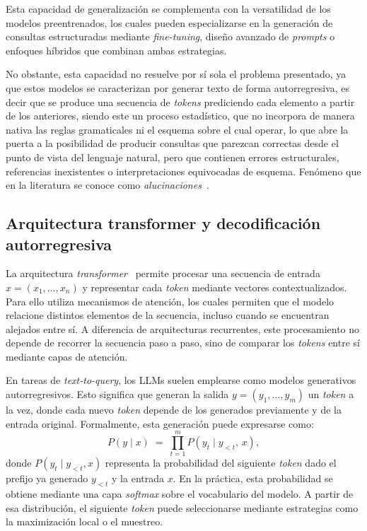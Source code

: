 Esta capacidad de generalización se complementa con la versatilidad de los modelos preentrenados, los cuales pueden especializarse en la generación de consultas estructuradas mediante \emph{fine-tuning}, diseño avanzado de \emph{prompts} o enfoques híbridos que combinan ambas estrategias.

No obstante, esta capacidad no resuelve por sí sola el problema presentado, ya que estos modelos se caracterizan por generar texto de forma autorregresiva, es decir que se produce una secuencia de \emph{tokens} prediciendo cada elemento a partir de los anteriores, siendo este un proceso estadístico, que no incorpora de manera nativa las reglas gramaticales ni el esquema sobre el cual operar, lo que abre la puerta a la posibilidad de producir consultas que parezcan correctas desde el punto de vista del lenguaje natural, pero que contienen errores estructurales, referencias inexistentes o interpretaciones equivocadas de esquema. Fenómeno que en la literatura se conoce como \emph{alucinaciones}~\cite{Ji2023Hallucination}. 

\subsection{Arquitectura transformer y decodificación autorregresiva}
La arquitectura \emph{transformer}~\cite{Vaswani2017Attention} permite procesar una secuencia de entrada $x = (x_1, \ldots, x_n)$ y representar cada \emph{token} mediante vectores contextualizados. Para ello utiliza mecanismos de atención, los cuales permiten que el modelo relacione distintos elementos de la secuencia, incluso cuando se encuentran alejados entre sí. A diferencia de arquitecturas recurrentes, este procesamiento no depende de recorrer la secuencia paso a paso, sino de comparar los \emph{tokens} entre sí mediante capas de atención.

En tareas de \emph{text-to-query}, los \acp{LLM} suelen emplearse como modelos generativos autorregresivos. Esto significa que generan la salida $y = (y_1, \ldots, y_m)$ un \emph{token} a la vez, donde cada nuevo \emph{token} depende de los generados previamente y de la entrada original. Formalmente, esta generación puede expresarse como:
\[P(y \mid x) \;=\; \prod_{t=1}^{m} P(y_t \mid y_{<t},\, x),\]
donde $P(y_t \mid y_{<t}, x)$ representa la probabilidad del siguiente \emph{token} dado el prefijo ya generado $y_{<t}$ y la entrada $x$. En la práctica, esta probabilidad se obtiene mediante una capa \emph{softmax} sobre el vocabulario del modelo. A partir de esa distribución, el siguiente \emph{token} puede seleccionarse mediante estrategias como la maximización local o el muestreo.

